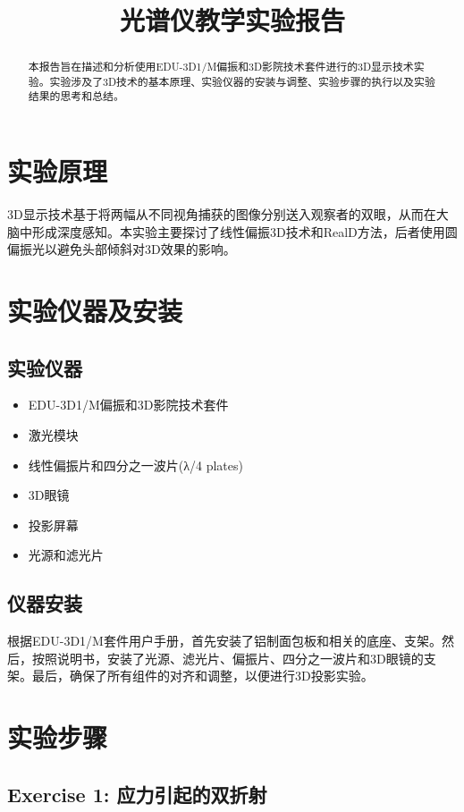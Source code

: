 \documentclass{ctexart}
\title{光谱仪教学实验报告}
\begin{document}
\maketitle

\begin{abstract}
本报告旨在描述和分析使用EDU-3D1/M偏振和3D影院技术套件进行的3D显示技术实验。实验涉及了3D技术的基本原理、实验仪器的安装与调整、实验步骤的执行以及实验结果的思考和总结。
\end{abstract}

\section{实验原理}
3D显示技术基于将两幅从不同视角捕获的图像分别送入观察者的双眼，从而在大脑中形成深度感知。本实验主要探讨了线性偏振3D技术和RealD方法，后者使用圆偏振光以避免头部倾斜对3D效果的影响。

\section{实验仪器及安装}
\subsection{实验仪器}
\begin{itemize}
    \item EDU-3D1/M偏振和3D影院技术套件
    \item 激光模块
    \item 线性偏振片和四分之一波片(λ/4 plates)
    \item 3D眼镜
    \item 投影屏幕
    \item 光源和滤光片
\end{itemize}
\subsection{仪器安装}
根据EDU-3D1/M套件用户手册，首先安装了铝制面包板和相关的底座、支架。然后，按照说明书，安装了光源、滤光片、偏振片、四分之一波片和3D眼镜的支架。最后，确保了所有组件的对齐和调整，以便进行3D投影实验。

\section{实验步骤}
\subsection{Exercise 1: 应力引起的双折射}
\end{document}
